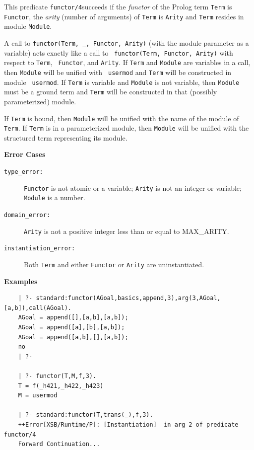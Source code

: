 \begin{description}
    This predicate {\tt functor/4}succeeds if the {\em functor} of the
    Prolog term {\tt Term} is {\tt Functor}, the {\em arity} (number
    of arguments) of {\tt Term} is {\tt Arity} and {\tt Term} resides
    in module {\tt Module}\@.

    A call to {\tt functor(Term, \_, Functor, Arity)} (with the module
    parameter as a variable) acts exactly like a call to {\tt
      functor(Term, Functor, Arity)} with respect to {\tt Term}, {\tt
      Functor}, and {\tt Arity}\@.  If {\tt Term} and {\tt Module} are
    variables in a call, then {\tt Module} will be unified with {\tt
      usermod} and {\tt Term} will be constructed in module {\tt
      usermod}\@.  If {\tt Term} is variable and {\tt Module} is not
    variable, then {\tt Module} must be a ground term and {\tt Term}
    will be constructed in that (possibly parameterized) module.

    If {\tt Term} is bound, then {\tt Module} will be unified with the
    name of the module of {\tt Term}\@.  If {\tt Term} is in a
    parameterized module, then {\tt Module} will be unified with the
    structured term representing its module.

    {\bf Error Cases}
    \begin{description}
    \item[{\tt type\_error:}] {\tt Functor} is not atomic or a
      variable; {\tt Arity} is not an integer or variable; {\tt
        Module} is a number.
    \item[{\tt domain\_error:}] {\tt Arity} is not a positive integer
      less than or equal to MAX\_ARITY.
    \item[{\tt instantiation\_error:}] Both {\tt Term} and either
      {\tt Functor} or {\tt Arity} are uninstantiated.
    \end{description}

    {\bf Examples}
    \begin{verbatim}
    | ?- standard:functor(AGoal,basics,append,3),arg(3,AGoal,[a,b]),call(AGoal).
    AGoal = append([],[a,b],[a,b]);
    AGoal = append([a],[b],[a,b]);
    AGoal = append([a,b],[],[a,b]);
    no
    | ?- 

    | ?- functor(T,M,f,3).
    T = f(_h421,_h422,_h423)
    M = usermod

    | ?- standard:functor(T,trans(_),f,3).
    ++Error[XSB/Runtime/P]: [Instantiation]  in arg 2 of predicate functor/4
    Forward Continuation...
    \end{verbatim}


\end{description}
